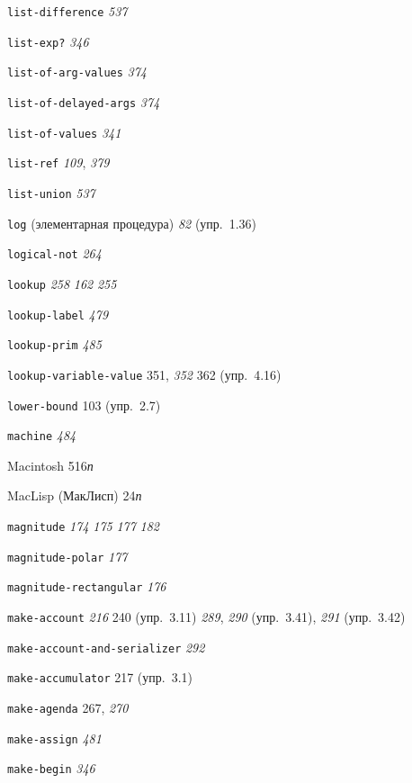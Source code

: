 \begin{theindex}
\item {\texttt{list-difference}} {\it 537}
\item {\texttt{list-exp?}} {\it 346}
\item {\texttt{list-of-arg-values}} {\it 374}
\item {\texttt{list-of-delayed-args}} {\it 374}
\item {\texttt{list-of-values}} {\it 341}
\item {\texttt{list-ref}} {\it 109}, {\it 379}
\item {\texttt{list-union}} {\it 537}
\item {\texttt{log} (элементарная процедура)} {\it 82} (упр.~1.36)
\item {\texttt{logical-not}} {\it 264}
\item {\texttt{lookup}}
   {\it 258}
   {\it 162}
   {\it 255}
\item {\texttt{lookup-label}} {\it 479}
\item {\texttt{lookup-prim}} {\it 485}
\item {\texttt{lookup-variable-value}} 351, {\it 352}
   362 (упр.~4.16)
\item {\texttt{lower-bound}} 103 (упр.~2.7)
\bigskip
\item {\texttt{machine}} {\it 484}
\item {Macintosh} 516{\it п}
\item {MacLisp (МакЛисп)} 24{\it п}
\item {\texttt{magnitude}}
   {\it 174}
   {\it 175}
   {\it 177}
   {\it 182}
\item {\texttt{magnitude-polar}} {\it 177}
\item {\texttt{magnitude-rectangular}} {\it 176}
\item {\texttt{make-account}} {\it 216}
   240 (упр.~3.11)
   {\it 289}, {\it 290} (упр.~3.41), {\it 291} (упр.~3.42)
\item {\texttt{make-account-and-serializer}} {\it 292}
\item {\texttt{make-accumulator}} 217 (упр.~3.1)
\item {\texttt{make-agenda}} 267, {\it 270}
\item {\texttt{make-assign}} {\it 481}
\item {\texttt{make-begin}} {\it 346}

\end{theindex}
